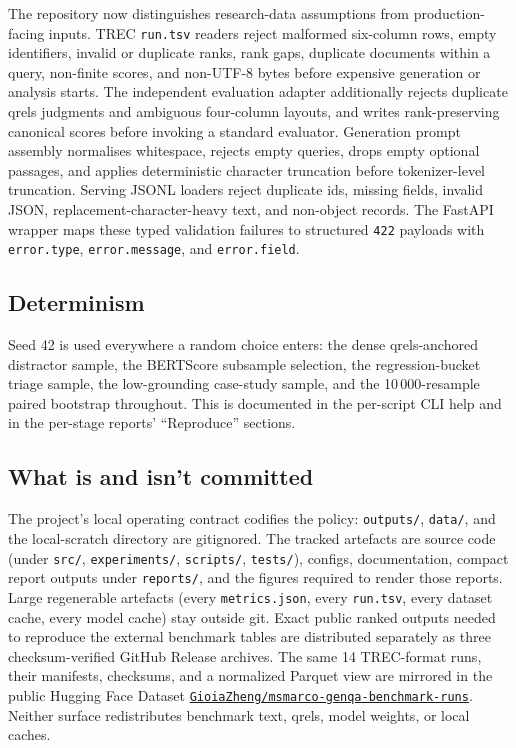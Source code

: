\documentclass[11pt,a4paper]{article}
\begin{document}
The repository now distinguishes research-data assumptions from
production-facing inputs.  TREC \texttt{run.tsv} readers reject
malformed six-column rows, empty identifiers, invalid or duplicate
ranks, rank gaps, duplicate documents within a query, non-finite
scores, and non-UTF-8 bytes before expensive generation or analysis
starts.  The independent evaluation adapter additionally rejects
duplicate qrels judgments and ambiguous four-column layouts, and
writes rank-preserving canonical scores before invoking a standard
evaluator.
Generation prompt assembly normalises whitespace, rejects empty
queries, drops empty optional passages, and applies deterministic
character truncation before tokenizer-level truncation.  Serving
JSONL loaders reject duplicate ids, missing fields, invalid JSON,
replacement-character-heavy text, and non-object records.  The
FastAPI wrapper maps these typed validation failures to structured
\texttt{422} payloads with \texttt{error.type},
\texttt{error.message}, and \texttt{error.field}.

\subsection{Determinism}

Seed 42 is used everywhere a random choice enters: the dense
qrels-anchored distractor sample, the BERTScore subsample
selection, the regression-bucket triage sample, the
low-grounding case-study sample, and the 10\,000-resample paired
bootstrap throughout.  This is documented in the per-script CLI
help and in the per-stage reports' ``Reproduce'' sections.

\subsection{What is and isn't committed}

The project's local operating contract codifies the policy:
\texttt{outputs/}, \texttt{data/}, and the local-scratch directory
are gitignored.  The tracked artefacts are source code (under
\texttt{src/}, \texttt{experiments/}, \texttt{scripts/},
\texttt{tests/}), configs, documentation, compact report outputs
under \texttt{reports/}, and the figures required to render those
reports.  Large regenerable artefacts (every \texttt{metrics.json},
every \texttt{run.tsv}, every dataset cache, every model cache) stay
outside git.  Exact public ranked outputs needed to reproduce the
external benchmark tables are distributed separately as three
checksum-verified GitHub Release archives.  The same 14 TREC-format
runs, their manifests, checksums, and a normalized Parquet view are
mirrored in the public Hugging Face Dataset
\href{https://huggingface.co/datasets/GioiaZheng/msmarco-genqa-benchmark-runs}%
{\texttt{GioiaZheng/msmarco-genqa-benchmark-runs}}.  Neither surface
redistributes benchmark text, qrels, model weights, or local caches.
\end{document}
